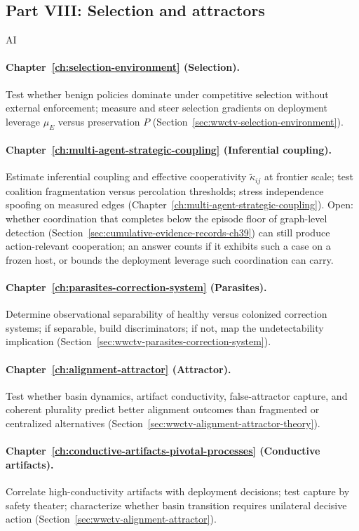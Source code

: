 \subsection{Part VIII: Selection and attractors}
\begin{authbar}{AI}
\paragraph{Chapter~\ref{ch:selection-environment} (Selection).}
Test whether benign policies dominate under competitive selection without external enforcement; measure and steer selection gradients on deployment leverage \(\mu_E\) versus preservation \(P\) (Section~\ref{sec:wwctv-selection-environment}).

\paragraph{Chapter~\ref{ch:multi-agent-strategic-coupling} (Inferential coupling).}
Estimate inferential coupling and effective cooperativity \(\tilde{\kappa}_{ij}\) at frontier scale; test coalition fragmentation versus percolation thresholds; stress independence spoofing on measured edges (Chapter~\ref{ch:multi-agent-strategic-coupling}). Open: whether coordination that completes below the episode floor of graph-level detection (Section~\ref{sec:cumulative-evidence-records-ch39}) can still produce action-relevant cooperation; an answer counts if it exhibits such a case on a frozen host, or bounds the deployment leverage such coordination can carry.

\paragraph{Chapter~\ref{ch:parasites-correction-system} (Parasites).}
Determine observational separability of healthy versus colonized correction systems; if separable, build discriminators; if not, map the undetectability implication (Section~\ref{sec:wwctv-parasites-correction-system}).

\paragraph{Chapter~\ref{ch:alignment-attractor} (Attractor).}
Test whether basin dynamics, artifact conductivity, false-attractor capture, and coherent plurality predict better alignment outcomes than fragmented or centralized alternatives (Section~\ref{sec:wwctv-alignment-attractor-theory}).

\paragraph{Chapter~\ref{ch:conductive-artifacts-pivotal-processes} (Conductive artifacts).}
Correlate high-conductivity artifacts with deployment decisions; test capture by safety theater; characterize whether basin transition requires unilateral decisive action (Section~\ref{sec:wwctv-alignment-attractor}).

\end{authbar}
\authbarsubneedspace
